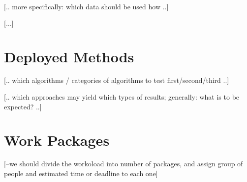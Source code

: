 \documentclass[10pt, oneside]{article}
\begin{document}
[.. more specifically: which data should be used how ..]

[...]



\section{Deployed Methods}

[.. which algorithms / categories of algorithms to test first/second/third ..]

[.. which approaches may yield which types of results; generally: what is to be expected? ..]


\section{Work Packages}

[--we should divide the workoload into number of packages, and assign group of people and estimated time or deadline to each one]
\end{document}
